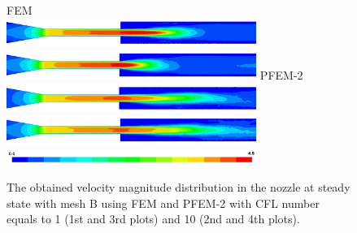 \begin{figure}[htbp]
    \centering
    FEM\\
    \includegraphics[width=3.2in]{imgs/nozzle_pump/nozzle_fem_pm_cfl1.png}
    \includegraphics[width=3.2in]{imgs/nozzle_pump/nozzle_fem_pm_cfl10.png}
    PFEM-2\\
    \includegraphics[width=3.2in]{imgs/nozzle_pump/nozzle_pfem_pm_cfl1.png}
    \includegraphics[width=3.2in]{imgs/nozzle_pump/nozzle_pfem_pm_cfl10.png}
    \includegraphics[width=3.2in]{imgs/nozzle_pump/nozzle_legend.png}
    \caption{The obtained velocity magnitude distribution in the nozzle at steady state with mesh B using FEM and PFEM-2 with CFL number equals to 1 (1st and 3rd plots) and 10 (2nd and 4th plots).}
    \label{fig:nozzlevelpm}
\end{figure}


